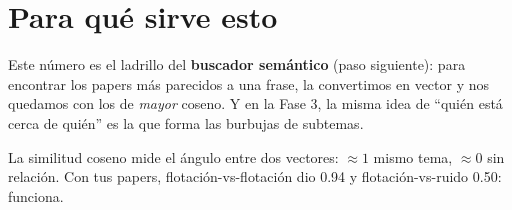 \documentclass[11pt,a4paper]{article}
\begin{document}
\section{Para qué sirve esto}

Este número es el ladrillo del \textbf{buscador semántico} (paso siguiente): para encontrar
los papers más parecidos a una frase, la convertimos en vector y nos quedamos con los de
\emph{mayor} coseno. Y en la Fase 3, la misma idea de ``quién está cerca de quién'' es la que
forma las burbujas de subtemas.

\begin{resumen}
La similitud coseno mide el ángulo entre dos vectores: $\approx 1$ mismo tema, $\approx 0$ sin
relación. Con tus papers, flotación-vs-flotación dio 0.94 y flotación-vs-ruido 0.50: funciona.
\end{resumen}
\end{document}
